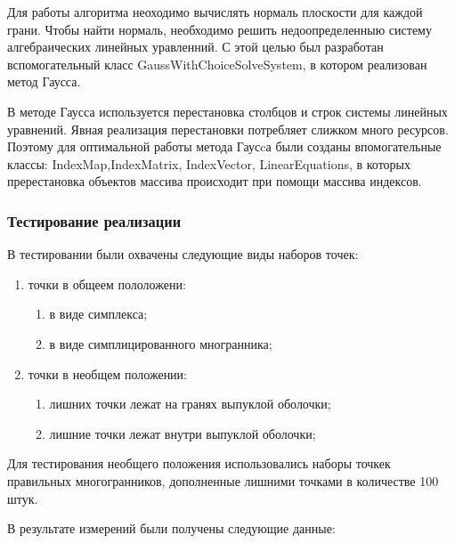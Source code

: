\documentclass[14pt]{extarticle}
\begin{document}
Для работы алгоритма неоходимо вычислять нормаль плоскости для каждой грани. Чтобы найти нормаль, необходимо решить недоопределенныю систему алгебраических линейных уравленний.  С этой целью был разработан вспомогательный класс GaussWithChoiceSolveSystem, в котором реализован метод Гаусса.

В методе Гаусса используется перестановка столбцов и строк системы линейных уравнений. Явная реализация перестановки потребляет слижком много ресурсов.
Поэтому для оптимальной работы метода Гаусcа были созданы впомогательные классы: IndexMap,IndexMatrix, IndexVector, LinearEquations, в которых пререстановка объектов массива происходит при помощи массива индексов.


\subsubsection{Тестирование реализации}
В тестировании были охвачены следующие виды наборов точек:
\begin{enumerate}[topsep=-0.5\parsep,itemsep=-0.5\parsep]
  \item точки в общеем пололожени:
  \begin{enumerate}[topsep=-0.5\parsep,itemsep=-0.5\parsep]
    \item в виде симплекса;
    \item  в виде симплицированного многранника;
  \end{enumerate}
  \item точки в необщем положении:
  \begin{enumerate}[topsep=-0.5\parsep,itemsep=-0.5\parsep]
    \item лишних точки лежат на гранях выпуклой оболочки;
    \item  лишние точки лежат внутри выпуклой оболочки;
  \end{enumerate}
\end{enumerate}
\medskip

Для тестирования необщего положения использовались наборы точкек правильных многогранников, дополненные лишними точками в количестве 100 штук.

В результате измерений были получены следующие данные:
\end{document}
